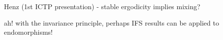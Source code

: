 
Henz (1st ICTP presentation) - stable ergodicity implies mixing?

ah! with the invariance principle, perhaps IFS results can be applied to endomorphisms!
